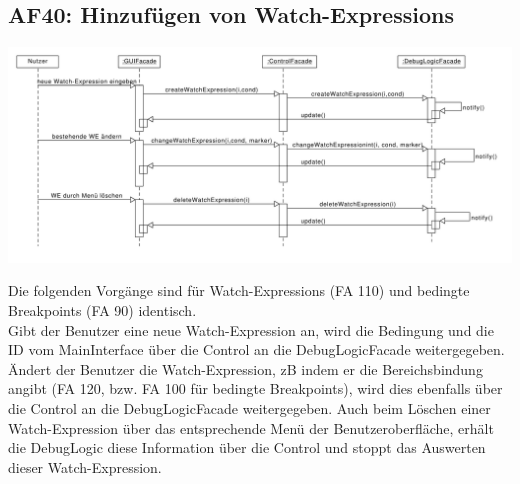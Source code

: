\documentclass[parskip=full]{scrartcl}
\begin{document}
\subsection{AF40: Hinzufügen von Watch-Expressions}
\begin{center}
\includegraphics[width=1.0\textwidth]{diagrammIdeenUmlet/SequenceDiagrams/seq_WatchExpressionsPDF.pdf}
\end{center}
Die folgenden Vorgänge sind für Watch-Expressions (FA 110) und bedingte Breakpoints (FA 90) identisch. \\
Gibt der Benutzer eine neue Watch-Expression an, wird die Bedingung und die ID vom MainInterface über 
die Control an die DebugLogicFacade weitergegeben. Ändert der Benutzer die Watch-Expression, zB indem 
er die Bereichsbindung angibt (FA  120, bzw. FA 100 für bedingte Breakpoints), wird dies ebenfalls über die Control an die DebugLogicFacade weitergegeben.
Auch beim Löschen einer Watch-Expression über das entsprechende Menü der Benutzeroberfläche, erhält die
DebugLogic diese Information über die Control und stoppt das Auswerten dieser Watch-Expression.

\newpage
\end{document}
